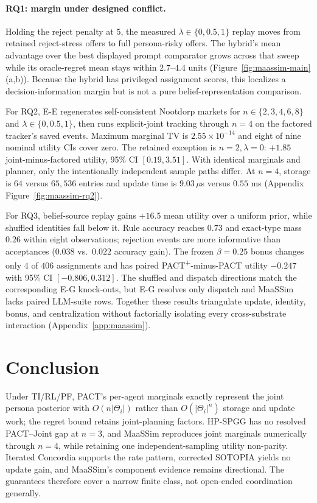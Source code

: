 \documentclass[letterpaper]{article} %
\begin{document}
\paragraph{RQ1: margin under designed conflict.} Holding the reject penalty at $5$, the measured $\lambda\in\{0,0.5,1\}$ replay moves from retained reject-stress offers to full persona-risky offers. The hybrid's mean advantage over the best displayed prompt comparator grows across that sweep while its oracle-regret mean stays within $2.7$--$4.4$ units (Figure~\ref{fig:maassim-main}(a,b)). Because the hybrid has privileged assignment scores, this localizes a decision-information margin but is not a pure belief-representation comparison.

For RQ2, E-E regenerates self-consistent Nootdorp markets for $n\in\{2,3,4,6,8\}$ and $\lambda\in\{0,0.5,1\}$, then runs explicit-joint tracking through $n=4$ on the factored tracker's saved events. Maximum marginal TV is $2.55{\times}10^{-14}$ and eight of nine nominal utility CIs cover zero. The retained exception is $n=2,\lambda=0$: $+1.85$ joint-minus-factored utility, 95\% CI $[0.19,3.51]$. With identical marginals and planner, only the intentionally independent sample paths differ. At $n=4$, storage is $64$ versus $65{,}536$ entries and update time is $9.03\,\mu$s versus $0.55$ ms (Appendix Figure~\ref{fig:maassim-rq2}).

For RQ3, belief-source replay gains $+16.5$ mean utility over a uniform prior, while shuffled identities fall below it. Rule accuracy reaches $0.73$ and exact-type mass $0.26$ within eight observations; rejection events are more informative than acceptances ($0.038$ vs.\ $0.022$ accuracy gain). The frozen $\beta=0.25$ bonus changes only $4$ of $406$ assignments and has paired PACT\textsuperscript{+}-minus-PACT utility $-0.247$ with 95\% CI $[-0.806,0.312]$. The shuffled and dispatch directions match the corresponding E-G knock-outs, but E-G resolves only dispatch and MaaSSim lacks paired LLM-suite rows. Together these results triangulate update, identity, bonus, and centralization without factorially isolating every cross-substrate interaction (Appendix~\ref{app:maassim}).


\section{Conclusion}
\label{sec:conclusion}
Under TI/RL/PF, PACT's per-agent marginals exactly represent the joint persona posterior with $O(n|\Theta_i|)$ rather than $O(|\Theta_i|^n)$ storage and update work; the regret bound retains joint-planning factors. HP-SPGG has no resolved PACT--Joint gap at $n=3$, and MaaSSim reproduces joint marginals numerically through $n=4$, while retaining one independent-sampling utility non-parity. Iterated Concordia supports the rate pattern, corrected SOTOPIA yields no update gain, and MaaSSim's component evidence remains directional. The guarantees therefore cover a narrow finite class, not open-ended coordination generally.
\end{document}
